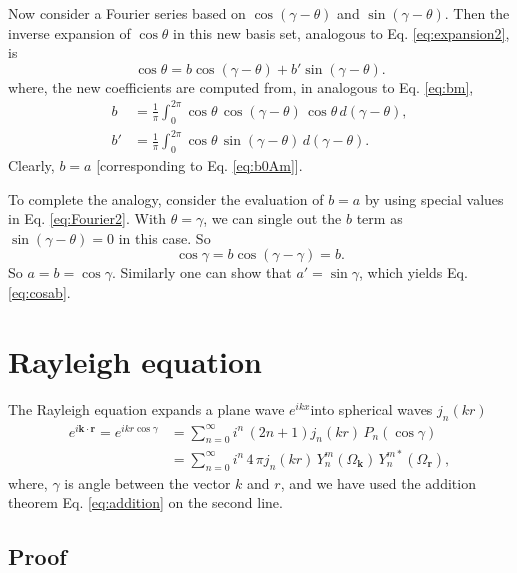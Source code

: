 \documentclass[11pt]{article}
\newcommand{\vct}[1]{\boldsymbol{\mathbf{#1}}}
\newcommand{\vr}{\vct{r}}
\newcommand{\vk}{\vct{k}}
\begin{document}
Now consider a Fourier series based on $\cos(\gamma - \theta)$
and $\sin(\gamma - \theta)$.
Then the inverse expansion of $\cos\theta$
in this new basis set, analogous to Eq. \eqref{eq:expansion2}, is
\begin{equation}
  \cos\theta
  =
  b \cos(\gamma - \theta)
+
  b' \sin(\gamma - \theta).
  \label{eq:Fourier2}
\end{equation}
where,
the new coefficients are computed from,
in analogous to Eq. \eqref{eq:bm},
\begin{align}
b &= \frac{1}{\pi} \int_0^{2\pi}
  \cos\theta \, \cos(\gamma - \theta) \, \cos\theta \, d(\gamma - \theta),
  \label{eq:c2}
\\
b' &= \frac{1}{\pi} \int_0^{2\pi}
  \cos\theta \, \sin(\gamma - \theta) \, d(\gamma - \theta).
  \label{eq:s2}
\end{align}
Clearly, $b = a$ [corresponding to Eq. \eqref{eq:b0Am}].

To complete the analogy,
consider the evaluation of $b = a$
by using special values in
Eq. \eqref{eq:Fourier2}.
%
With $\theta = \gamma$,
we can single out the $b$ term
as $\sin(\gamma - \theta) = 0$
in this case.
%
So
\begin{equation}
  \cos\gamma
=
  b \cos(\gamma - \gamma)
= b.
\end{equation}
So $a = b = \cos\gamma$.
%
Similarly one can show that $a' = \sin\gamma$,
which yields Eq. \eqref{eq:cosab}.



\section{\label{sec:rayleigh}Rayleigh equation}



The Rayleigh equation expands a plane wave $e^{i k x}$into spherical waves $j_n(kr)$
\begin{align}
  e^{i\vk \cdot \vr}
=
  e^{ikr\cos\gamma}
&=
  \sum_{n = 0}^\infty
i^n \, ( 2 n + 1 )
j_n(k r) \, P_n(\cos\gamma)
\label{eq:rayleigh} \\
&=
  \sum_{n = 0}^\infty
i^n \, 4 \, \pi
j_n(k r) \, Y_n^m(\Omega_{\vk}) \, Y_n^{m*}(\Omega_{\vr}),
\label{eq:rayleigh_yy}
\end{align}
where, $\gamma$ is angle between the vector $k$ and $r$,
and we have used the addition theorem Eq. \eqref{eq:addition}
on the second line.



\subsection{\label{sec:rayleigh_proof}Proof}
\end{document}
